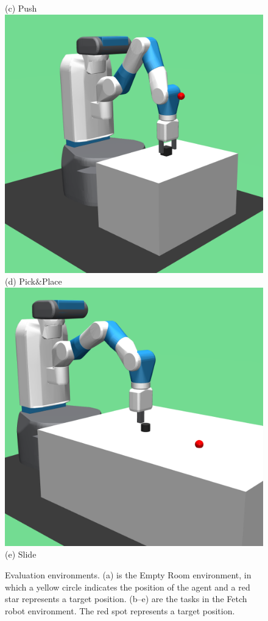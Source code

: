 \begin{figure}[t]
  ({c}) Push      
\endminipage\hfill
{}%
  \centering
  \includegraphics[width=\linewidth]{figures/chapter3/pick.png}
  ({d}) Pick$\&$Place
\endminipage\hfill
{}%
  \centering
  \includegraphics[width=\linewidth]{figures/chapter3/slide.png}
  ({e}) Slide     
\endminipage
\caption[Evaluation environments of ESIL.]{Evaluation environments. ({a}) is the Empty Room environment, in which a yellow circle indicates the position of the agent and a red star represents a target position. ({b}--{e}) are the tasks in the Fetch robot environment. The red spot represents a target position.}
\label{fig:env}
\end{figure}

